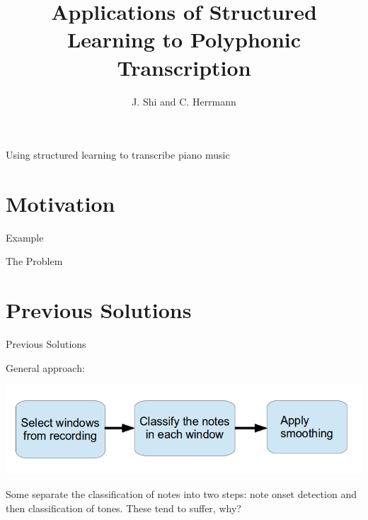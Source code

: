 \documentclass{beamer}
\title{Applications of Structured Learning to Polyphonic Transcription}
\author[]{J. Shi and C. Herrmann}
\institute[]{Presented for Advanced Topics in Machine Learning}
\begin{document}
\begin{frame}{}
\titlepage
Using structured learning to transcribe piano music
\end{frame}

\section{Motivation}
\begin{frame}{Example}
\end{frame}


\begin{frame}{The Problem}

\end{frame}

\section{Previous Solutions}
\begin{frame}{Previous Solutions}

General approach:

\includegraphics[scale=.4]{algorithm_template.png}

Some separate the classification of notes into two steps: note onset detection and then classification of tones. These tend to suffer, why?
\end{frame}
\end{document}
